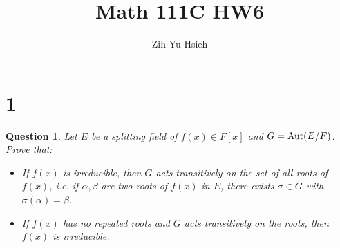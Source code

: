 \documentclass{article}
\title{Math 111C HW6}
\author{Zih-Yu Hsieh}
\newtheorem{question}{Question}
\begin{document}
\maketitle

\section*{1}
\begin{myBox}[]{}
    \begin{question}
        Let $E$ be a splitting field of $f(x)\in F[x]$ and $G=\textmd{Aut}(E/F)$. Prove that:
        \begin{itemize}
            \item[(a)] If $f(x)$ is irreducible, then $G$ acts transitively on the set of all roots of $f(x)$, i.e. if $\alpha,\beta$ are two roots of $f(x)$ in $E$, there exists $\sigma\in G$ with $\sigma(\alpha)=\beta$.
            \item[(b)] If $f(x)$ has no repeated roots and $G$ acts transitively on the roots, then $f(x)$ is irreducible. 
        \end{itemize}
    \end{question}
\end{myBox}
\end{document}
